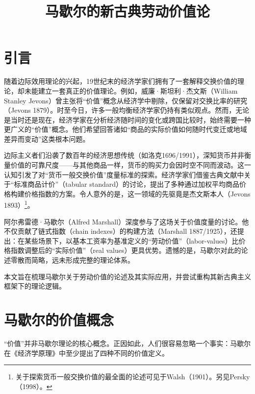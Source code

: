 \appendix

\begin{translation}
\label{cha:translation}

\title{马歇尔的新古典劳动价值论}
\maketitle

\tableofcontents

\section{引言}

随着边际效用理论的兴起，19世纪末的经济学家们拥有了一套解释交换价值的理论，却未能建立一套真正的价值理论。例如，威廉·斯坦利·杰文斯（William Stanley Jevons）曾主张将“价值”概念从经济学中剔除，仅保留对交换比率的研究（Jevons 1879）。时至今日，许多一般均衡经济学家仍持有类似观点。然而，无论是当时还是现在，经济学家在分析经济随时间的变化或跨国比较时，始终需要一种更广义的“价值”概念。他们希望回答诸如“商品的实际价值如何随时代变迁或地域差异而变动”这类根本问题。

边际主义者们沿袭了数百年的经济思想传统（如洛克1696/1991），深知货币并非衡量价值的可靠尺度——与其他商品一样，货币的购买力会因时空不同而波动。这一认知引发了对“货币一般交换价值”度量标准的探索。经济学家们借鉴古典文献中关于“标准商品计价”（tabular standard）的讨论，提出了多种通过加权平均商品价格构建价格指数的方案。令人意外的是，这一领域的先驱竟是杰文斯本人（Jevons 1893）\footnote{关于探索货币一般交换价值的最全面的论述可见于Walsh（1901）。另见Persky（1998）。}。

阿尔弗雷德·马歇尔（Alfred Marshall）深度参与了这场关于价值度量的讨论。他不仅贡献了链式指数（chain indexes）的构建方法（Marshall 1887/1925），还提出：在某些场景下，以基本工资率为基准定义的“劳动价值”（labor-values）比价格指数调整后的“实际价值”（real values）更具优势。遗憾的是，马歇尔对此的论述零散而简略，远未形成完整的理论体系。

本文旨在梳理马歇尔关于劳动价值的论述及其实际应用，并尝试重构其新古典主义框架下的理论逻辑。

\section{马歇尔的价值概念}

“价值”并非马歇尔理论的核心概念。正因如此，人们很容易忽略一个事实：马歇尔在《经济学原理》中至少提出了四种不同的价值定义。


\end{translation}
